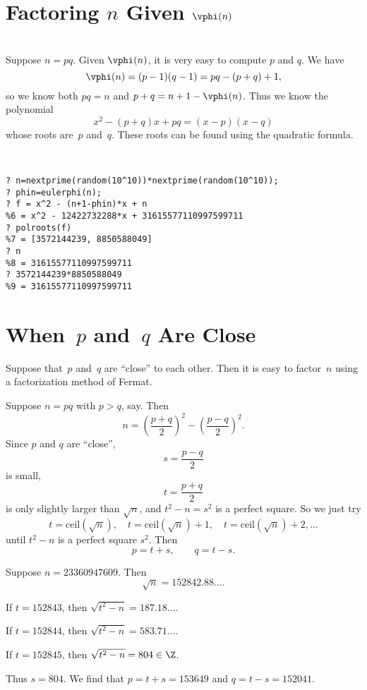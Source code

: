 \documentclass[11pt]{report}
\begin{document}
\section{Factoring $n$ Given $\vphi(n)$}\label{sec:phin}

\\
Suppose $n=pq$.  Given $\vphi(n)$, it is very easy to
compute $p$ and $q$.  We have
$$
  \vphi(n) = (p-1)(q-1) = pq-(p+q)+1,
$$
so we know both $pq=n$ and $p+q = n+1 - \vphi(n)$.
Thus we know the polynomial
$$
  x^2 - (p+q)x + pq = (x-p)(x-q)
$$
whose roots are~$p$ and~$q$.
These roots can be found using the quadratic formula.
\begin{example}\mbox{}\vspace{-5ex}\\
  \begin{verbatim}
? n=nextprime(random(10^10))*nextprime(random(10^10));
? phin=eulerphi(n);
? f = x^2 - (n+1-phin)*x + n
%6 = x^2 - 12422732288*x + 31615577110997599711
? polroots(f)
%7 = [3572144239, 8850588049]
? n
%8 = 31615577110997599711
? 3572144239*8850588049
%9 = 31615577110997599711
\end{verbatim}
\end{example}



\section{When~$p$ and~$q$ Are Close}
Suppose that~$p$ and~$q$ are ``close'' to each other.  Then
it is easy to factor~$n$ using a factorization
method of Fermat.

Suppose $n=pq$ with $p>q$, say.  Then
$$n = \left(\frac{p+q}{2}\right)^2 -
  \left(\frac{p-q}{2}\right)^2.$$
Since $p$ and $q$ are ``close'',
$$
  s = \frac{p-q}{2}
$$
is small,
$$
  t = \frac{p+q}{2}
$$
is only slightly larger than $\sqrt{n}$,
and $t^2-n=s^2$ is a perfect square.
So we just try
$$
  t = \text{ceil}(\sqrt{n}), \quad t=\text{ceil}(\sqrt{n})+1,
  \quad t=\text{ceil}(\sqrt{n})+2, \ldots
$$
until $t^2-n$ is a perfect square $s^2$.
Then
$$
  p = t+s,\qquad q=t-s.
$$
\begin{example}
  Suppose $n=23360947609$.
  Then
  $$\sqrt{n} = 152842.88\ldots.$$

  If $t=152843$, then $\sqrt{t^2-n} = 187.18\ldots$.

  If $t=152844$, then $\sqrt{t^2-n} = 583.71\ldots$.

  If $t=152845$, then $\sqrt{t^2-n} = 804\in\Z$.

  Thus $s=804$.  We find that $p=t+s=153649$ and $q=t-s=152041$.
\end{example}
\end{document}
